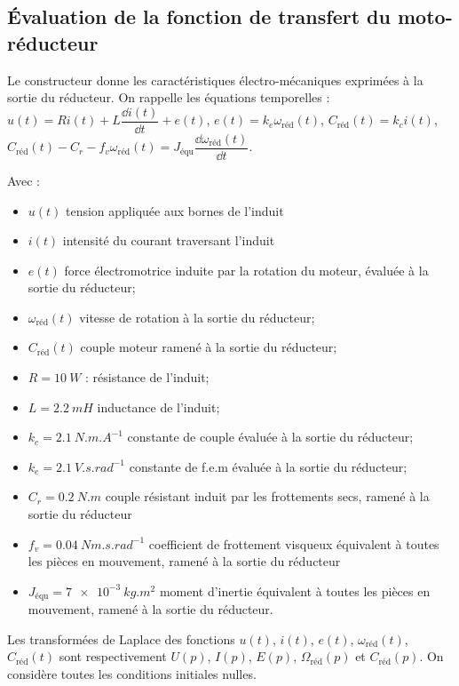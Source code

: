 \begin{multicols}{2}
\subsection*{Évaluation de la fonction de transfert du moto-réducteur}
Le constructeur donne les caractéristiques électro-mécaniques exprimées à la sortie du réducteur.
On rappelle les équations temporelles :
$u(t) = R i(t) + L \dfrac{\dd i(t)}{\dd t} + e(t)$, $e(t) = k_e  \omega_{\text{réd}}(t)$, 
$C_{\text{réd}} (t)= k_c  i(t)$, $C_{\text{réd}} (t) - C_r - f_v \omega_{\text{réd}}(t)= J_{\text{équ}} \dfrac{\dd \omega_{\text{réd}}(t)}{\dd t}$. 

Avec :
\begin{itemize}
\item $u(t)$ tension appliquée aux bornes de l’induit 
\item $i(t)$ intensité du courant traversant l’induit
\item $e(t)$ force électromotrice induite par la rotation du moteur, évaluée à la  sortie du réducteur;
\item $\omega_{\text{réd}}(t)$ vitesse de rotation à la sortie du réducteur;
\item $C_{\text{réd}} (t)$ couple moteur ramené à la sortie du réducteur;
\item $R = \SI{10}{W}$ : résistance de l’induit;
\item $L = \SI{2,2}{mH}$ inductance de l’induit;
\item $k_c = \SI{2,1}{N.m.A^{-1}}$ constante de couple évaluée à la sortie du réducteur;
\item $k_e = \SI{2,1}{V.s.rad^{-1}}$ constante de f.e.m évaluée à la sortie du réducteur;
\item $C_r = \SI{0,2}{N.m}$ couple résistant induit par les frottements secs, ramené à la sortie du réducteur 
\item $f_v = \SI{0,04}{Nm.s.rad^{-1}}$ coefficient de frottement visqueux équivalent à toutes les pièces en mouvement, ramené à la sortie du réducteur 
\item $J_{\text{équ}} = \SI{7e-3}{kg.m^2}$ moment d’inertie équivalent à toutes les pièces en mouvement, ramené à la sortie du réducteur. 
\end{itemize}

Les transformées de Laplace des fonctions $u(t)$, $i(t)$, $e(t)$, $\omega_{\text{réd}}(t)$,  $C_{\text{réd}}(t)$ sont respectivement $U(p)$, $I(p)$, $E(p)$, $\Omega_{\text{réd}}(p)$ et $C_{\text{réd}}(p)$. On considère toutes les conditions initiales nulles.


\end{multicols}
